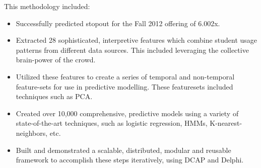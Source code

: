 This methodology included:
\begin{itemize}
\item Successfully predicted stopout for the Fall 2012 offering of 6.002x. 
\item Extracted 28 sophisticated, interpretive features which combine student usage patterns from different data sources. This included leveraging the collective brain-power of the crowd. 
\item Utilized these features to create a series of temporal and non-temporal feature-sets for use in predictive modelling. These featuresets included techniques such as PCA.
\item Created over 10,000 comprehensive, predictive models using a variety of state-of-the-art techniques, such as logistic regression, HMMs, K-nearest-neighbors, etc.
\item Built and demonstrated a scalable, distributed, modular and reusable framework to accomplish these steps iteratively, using DCAP and Delphi.
\end{itemize}